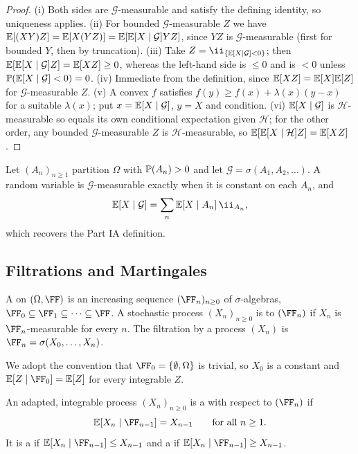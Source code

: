 \documentclass[a4paper]{scrartcl}
\begin{document}
\begin{proof}
	(i) Both sides are $\mathcal{G}$-measurable and satisfy the defining identity, so uniqueness applies. (ii) For bounded $\mathcal{G}$-measurable $Z$ we have $\mathbb{E}[(XY)Z] = \mathbb{E}[X(YZ)] = \mathbb{E}[\mathbb{E}[X\mid\mathcal{G}]YZ]$, since $YZ$ is $\mathcal{G}$-measurable (first for bounded $Y$, then by truncation).
	(iii) Take $Z = \ii_{\{\EE[X\mid\mathcal{G}]<0\}}$; then $\mathbb{E}[\mathbb{E}[X\mid\mathcal{G}]Z] = \mathbb{E}[XZ]\geq 0$, whereas the left-hand side is $\leq 0$ and is $<0$ unless $\mathbb{P}(\mathbb{E}[X\mid\mathcal{G}]<0) = 0$.
	(iv) Immediate from the definition, since $\mathbb{E}[XZ] = \mathbb{E}[X]\mathbb{E}[Z]$ for $\mathcal{G}$-measurable $Z$.
	(v) A convex $f$ satisfies $f(y)\geq f(x) + \lambda(x)(y-x)$ for a suitable $\lambda(x)$; put $x = \mathbb{E}[X\mid\mathcal{G}]$, $y = X$ and condition.
	(vi) $\mathbb{E}[X\mid\mathcal{G}]$ is $\mathcal{H}$-measurable so equals its own conditional expectation given $\mathcal{H}$; for the other order, any bounded $\mathcal{G}$-measurable $Z$ is $\mathcal{H}$-measurable, so $\mathbb{E}[\mathbb{E}[X\mid\mathcal{H}]Z] = \mathbb{E}[XZ]$.
\end{proof}

\begin{example}
	Let $(A_n)_{n\geq1}$ partition $\Omega$ with $\mathbb{P}(A_n) > 0$ and let $\mathcal{G} = \sigma(A_1,A_2,\dots)$. A random variable is $\mathcal{G}$-measurable exactly when it is constant on each $A_n$, and
	$$
	\EE[X\mid\mathcal{G}] = \sum_n \EE[X\mid A_n]\,\ii_{A_n},
	$$
	which recovers the Part IA definition.
\end{example}

\subsection{Filtrations and Martingales}

\begin{definition}[Filtration]
	A  on $(\Omega,\FF)$ is an increasing sequence $(\FF_n)_{n\geq 0}$ of $\sigma$-algebras, $\FF_0 \subseteq \FF_1 \subseteq \cdots \subseteq \FF$. A stochastic process $(X_n)_{n\geq0}$ is  to $(\FF_n)$ if $X_n$ is $\FF_n$-measurable for every $n$. The filtration  by a process $(X_n)$ is $\FF_n = \sigma(X_0,\dots,X_n)$.
\end{definition}

We adopt the convention that $\FF_0 = \{\emptyset,\Omega\}$ is trivial, so $X_0$ is a constant and $\EE[Z\mid\FF_0] = \EE[Z]$ for every integrable $Z$.

\begin{definition}[Martingale]
	An adapted, integrable process $(X_n)_{n\geq0}$ is a  with respect to $(\FF_n)$ if
	$$
	\EE[X_n \mid \FF_{n-1}] = X_{n-1} \qquad \text{for all } n \geq 1.
	$$
	It is a  if $\EE[X_n\mid\FF_{n-1}] \leq X_{n-1}$ and a  if $\EE[X_n\mid\FF_{n-1}]\geq X_{n-1}$.
\end{definition}
\end{document}
